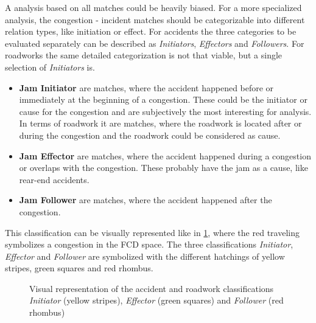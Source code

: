 A analysis based on all matches could be heavily biased. For a more specialized analysis, the congestion - incident matches should be categorizable into different relation types, like initiation or effect. For accidents the three categories to be evaluated separately can be described as \textit{Initiators}, \textit{Effectors} and \textit{Followers}. For roadworks the same detailed categorization is not that viable, but a single selection of \textit{Initiators} is.
\begin{itemize}
	\setlength\itemsep{0.1em}	
	\item[] \textbf{Jam Initiator} are matches, where the accident happened before or immediately at the beginning of a congestion. These could be the initiator or cause for the congestion and are subjectively the most interesting for analysis. In terms of roadwork it are matches, where the roadwork is located after or during the congestion and the roadwork could be considered as cause.
	\item[] \textbf{Jam Effector} are matches, where the accident happened during a congestion or overlaps with the congestion. These probably have the jam as a cause, like rear-end accidents.
	\item[] \textbf{Jam Follower} are matches, where the accident happened after the congestion. 
\end{itemize}
This classification can be visually represented like in \cref{img:jam_classifation}, where the red traveling symbolizes a congestion in the FCD space. The three classifications \textit{Initiator}, \textit{Effector} and \textit{Follower} are symbolized with the different hatchings of yellow stripes, green squares and red rhombus.
\begin{figure}[htp]
	\centering
	\begin{minipage}{0.5\textwidth}
		\centering
		
		\label{fig:1a}
	\end{minipage}%
	\begin{minipage}{0.5\textwidth}
		\centering
		
		\label{fig:1b}
	\end{minipage}%
	\caption{Visual representation of the accident and roadwork classifications \textit{Initiator} (yellow stripes), \textit{Effector} (green squares) and \textit{Follower} (red rhombus)}
	\label{img:jam_classifation}
\end{figure}
